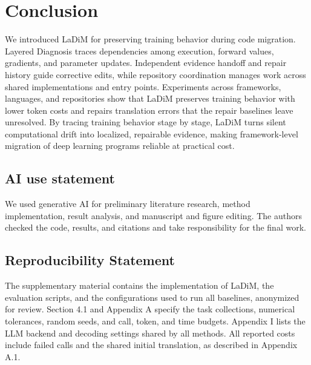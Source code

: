 \documentclass{article}
\begin{document}
\section{Conclusion}
We introduced LaDiM for preserving training behavior during code migration. Layered Diagnosis traces dependencies among execution, forward values, gradients, and parameter updates. Independent evidence handoff and repair history guide corrective edits, while repository coordination manages work across shared implementations and entry points. Experiments across frameworks, languages, and repositories show that LaDiM preserves training behavior with lower token costs and repairs translation errors that the repair baselines leave unresolved. By tracing training behavior stage by stage, LaDiM turns silent computational drift into localized, repairable evidence, making framework-level migration of deep learning programs reliable at practical cost.


\subsection*{AI use statement}
We used generative AI for preliminary literature research, method implementation, result analysis, and manuscript and figure editing. The authors checked the code, results, and citations and take responsibility for the final work.


\subsection*{Reproducibility Statement}
The supplementary material contains the implementation of LaDiM, the evaluation scripts, and the configurations used to run all baselines, anonymized for review. Section 4.1 and Appendix A specify the task collections, numerical tolerances, random seeds, and call, token, and time budgets. Appendix I lists the LLM backend and decoding settings shared by all methods. All reported costs include failed calls and the shared initial translation, as described in Appendix A.1.



\end{document}
